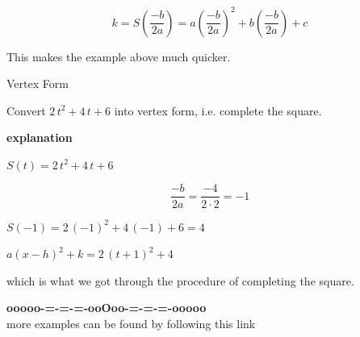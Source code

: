 \documentclass{ximera}
\begin{document}
\[
k = S\left( \frac{-b}{2 a} \right) = a \left( \frac{-b}{2 a} \right)^2 + b \left( \frac{-b}{2 a} \right) + c 
\]







This makes the example above much quicker.





\begin{example} Vertex Form



Convert $2 \, t^2 + 4 \, t + 6$ into vertex form, i.e. complete the square.


\textbf{\textcolor{red!75!green}{explanation}} 


$S(t) = 2 \, t^2 + 4 \, t + 6$


\[
\frac{-b}{2 a} = \frac{-4}{2 \cdot 2} = -1
\]


$S(-1) = 2 \, (-1)^2 + 4 \, (-1) + 6 = 4$



$a (x - h)^2 + k = 2 \, (t+1)^2 + 4$

which is what we got through the procedure of completing the square.





\end{example}




\begin{center}
\textbf{\textcolor{green!50!black}{ooooo-=-=-=-ooOoo-=-=-=-ooooo}} \\

more examples can be found by following this link\\ 

\end{center}
\end{document}
